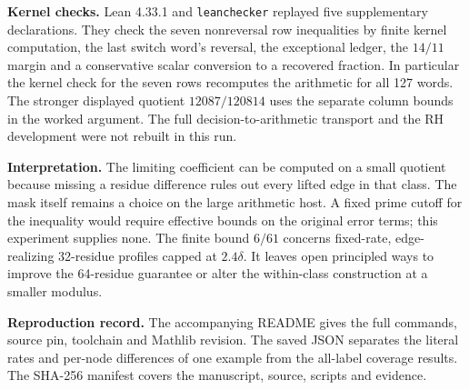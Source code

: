 \documentclass[12pt,letterpaper]{article}
\begin{document}
\textbf{Kernel checks.} Lean 4.33.1 and \texttt{leanchecker} replayed five supplementary declarations. They check the seven nonreversal row inequalities by finite kernel computation, the last switch word's reversal, the exceptional ledger, the \(14/11\) margin and a conservative scalar conversion to a recovered fraction. In particular the kernel check for the seven rows recomputes the arithmetic for all 127 words. The stronger displayed quotient \(12087/120814\) uses the separate column bounds in the worked argument. The full decision-to-arithmetic transport and the RH development were not rebuilt in this run.

\textbf{Interpretation.} The limiting coefficient can be computed on a small quotient because missing a residue difference rules out every lifted edge in that class. The mask itself remains a choice on the large arithmetic host. A fixed prime cutoff for the inequality would require effective bounds on the original error terms; this experiment supplies none. The finite bound \(6/61\) concerns fixed-rate, edge-realizing 32-residue profiles capped at \(2.4\delta\). It leaves open principled ways to improve the 64-residue guarantee or alter the within-class construction at a smaller modulus.

\textbf{Reproduction record.} The accompanying README gives the full commands, source pin, toolchain and Mathlib revision. The saved JSON separates the literal rates and per-node differences of one example from the all-label coverage results. The SHA-256 manifest covers the manuscript, source, scripts and evidence.
\end{document}
